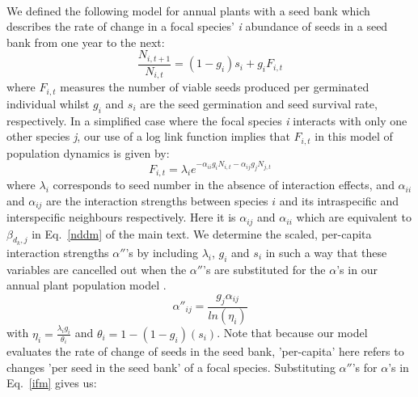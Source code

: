 \documentclass[a4,12pt]{article}
\begin{document}
        \paragraph{} 
        We defined the following model for annual plants with a seed bank \parencite{Levine2009, Mayfield2017, Bimler2018} which describes the rate of change in a focal species' \textit{i} abundance of seeds in a seed bank from one year to the next: 
            \begin{equation}
                \frac{N_{i, t+1}}{N_{i, t}} = \left( 1 - g_{i} \right) s_{i} + g_{i}F_{i, t}
                \label{ifm}
            \end{equation}
        where \(F_{i,t}\) measures the number of viable seeds produced per germinated individual whilst \(g_{i}\) and \(s_{i}\) are the seed germination and seed survival rate, respectively. In a simplified case where the focal species \textit{i} interacts with only one other species \textit{j}, our use of a log link function implies that \(F_{i,t}\) in this model of population dynamics is given by:
            \begin{equation}
                F_{i,t} = \lambda_{i} e^{- \alpha_{ii} g_{i} N_{i, t} -  \alpha_{ij} g_{j} N_{j, t} }
                \label{fecundity}   
            \end{equation}
        where \(\lambda_{i}\) corresponds to seed number in the absence of interaction effects, and \(\alpha_{ii}\) and \(\alpha_{ij}\) are the interaction strengths between species \(i\) and its intraspecific and interspecific neighbours respectively. Here it is \(\alpha_{ij}\) and \(\alpha_{ii}\) which are equivalent to \(\beta_{d_k, j}\) in Eq.~\ref{nddm} of the main text. 
        We determine the scaled, per-capita interaction strengths ${\alpha}''$'s by including \(\lambda_{i}\), \(g_{i}\) and \(s_{i}\) in such a way that these variables are cancelled out when the ${\alpha}''$'s are substituted for the $\alpha$'s in our annual plant population model \parencite{Godoy2014, Bimler2018}. 
        \begin{equation}
            {\alpha}''_{ij} = \frac{g_{j} \alpha_{ij}}{ln(\eta_{i})}
        \end{equation}
        with $\eta_{i} = \frac{\lambda_{i} g_{i}}{\theta_{i}}$ and $\theta_{i} = 1 - (1 - g_{i})(s_{i})$. %
        Note that because our model evaluates the rate of change of seeds in the seed bank, 'per-capita' here refers to changes 'per seed in the seed bank' of a focal species. Substituting ${\alpha}''$'s for $\alpha$'s in Eq.~\ref{ifm} gives us: 
    
\end{document}
